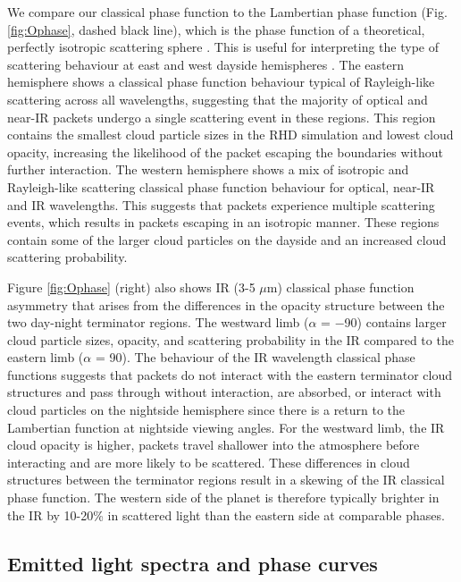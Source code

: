 \documentclass{aa}
\begin{document}
We compare our classical phase function to the Lambertian phase function (Fig. \ref{fig:Ophase}, dashed black line), which is the phase function of a theoretical, perfectly isotropic scattering sphere \citep[e.g.][]{Seager2010, Madhusudhan2012}.
This is useful for interpreting the type of scattering behaviour at east and west dayside hemispheres \citep{Madhusudhan2012}.
The eastern hemisphere shows a classical phase function behaviour typical of Rayleigh-like scattering across all wavelengths, suggesting that the majority of optical and near-IR packets undergo a single scattering event in these regions.
This region contains the smallest cloud particle sizes in the RHD simulation and lowest cloud opacity, increasing the likelihood of the packet escaping the boundaries without further interaction.
The western hemisphere shows a mix of isotropic and Rayleigh-like scattering classical phase function behaviour for optical, near-IR and IR wavelengths.
This suggests that packets experience multiple scattering events, which results in packets escaping in an isotropic manner.
These regions contain some of the larger cloud particles on the dayside and an increased cloud scattering probability.

Figure \ref{fig:Ophase} (right) also shows IR (3-5 $\mu$m) classical phase function asymmetry that arises from the differences in the opacity structure between the two day-night terminator regions.
The westward limb ($\alpha$ = $-$90\degr) contains larger cloud particle sizes, opacity, and scattering probability in the IR compared to the eastern limb ($\alpha$ = 90\degr).
The behaviour of the IR wavelength classical phase functions suggests that packets do not interact with the eastern terminator cloud structures and pass through without interaction, are absorbed, or interact with cloud particles on the nightside hemisphere since there is a return to the Lambertian function at nightside viewing angles.
For the westward limb, the IR cloud opacity is higher, packets travel shallower into the atmosphere before interacting and are more likely to be scattered.
These differences in cloud structures between the terminator regions result in a skewing of the IR classical phase function.
The western side of the planet is therefore typically brighter in the IR by 10-20\% in scattered light than the eastern side at comparable phases.

\subsection{Emitted light spectra and phase curves}
\label{sec:emitted}
\end{document}
